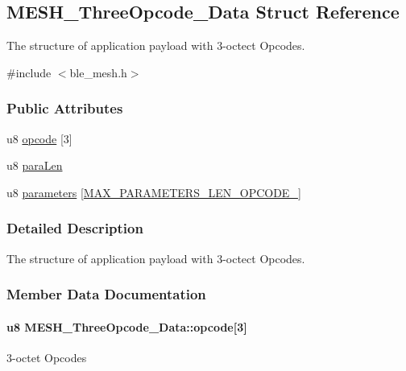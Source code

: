 \hypertarget{struct_m_e_s_h___three_opcode___data}{}\subsection{M\+E\+S\+H\+\_\+\+Three\+Opcode\+\_\+\+Data Struct Reference}
\label{struct_m_e_s_h___three_opcode___data}


The structure of application payload with 3-\/octect Opcodes.  




{\ttfamily \#include $<$ble\+\_\+mesh.\+h$>$}

\subsubsection*{Public Attributes}
\begin{DoxyCompactItemize}
\item 
u8 \hyperlink{struct_m_e_s_h___three_opcode___data_a3163d5edac1fc736fcbb36e2f0747265}{opcode} \mbox{[}3\mbox{]}
\item 
u8 \hyperlink{struct_m_e_s_h___three_opcode___data_a4b59aca4cd6ecc80eb52019403270a56}{para\+Len}
\item 
u8 \hyperlink{struct_m_e_s_h___three_opcode___data_aad81dadfbfec21b76fc328fcbf15a2cc}{parameters} \mbox{[}\hyperlink{group___m_e_s_h___p_a_r_a_m_s___l_e_n___d_e_f_gacef179ddfe76e5b95a9327d370046fae}{M\+A\+X\+\_\+\+P\+A\+R\+A\+M\+E\+T\+E\+R\+S\+\_\+\+L\+E\+N\+\_\+\+O\+P\+C\+O\+D\+E\+\_}\mbox{]}
\end{DoxyCompactItemize}


\subsubsection{Detailed Description}
The structure of application payload with 3-\/octect Opcodes. 

\subsubsection{Member Data Documentation}
\paragraph[{\texorpdfstring{opcode}{opcode}}]{\setlength{\rightskip}{0pt plus 5cm}u8 M\+E\+S\+H\+\_\+\+Three\+Opcode\+\_\+\+Data\+::opcode\mbox{[}3\mbox{]}}\hypertarget{struct_m_e_s_h___three_opcode___data_a3163d5edac1fc736fcbb36e2f0747265}{}\label{struct_m_e_s_h___three_opcode___data_a3163d5edac1fc736fcbb36e2f0747265}
3-\/octet Opcodes 
